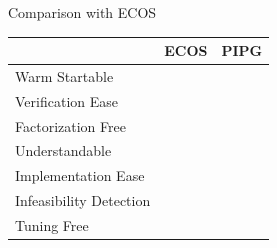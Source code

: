 \documentclass[aspectratio=169]{beamer}
\newcommand{\cmark}{\textcolor{green}{\text{\ding{51}}}}
\newcommand{\xmark}{\textcolor{red}{\text{\ding{55}}}}
\begin{document}
\begin{frame}{Comparison with ECOS}
    \begin{center}
        \begin{tabular}{ |p{4cm}||p{1cm}|p{1cm}|}
            \hline
              & ECOS & PIPG \\
            \hline
            Warm Startable   & \xmark    &\cmark\\
            Verification Ease   & \xmark    &\cmark\\
            Factorization Free&   \xmark  & \cmark\\
            Understandable &   \xmark  & \cmark\\
            Implementation Ease&   \xmark  & \cmark\\
            Infeasibility Detection&   \cmark  & \cmark\\
            Tuning Free&   \cmark  & \xmark\\
            \hline
        \end{tabular}       
    \end{center}
\end{frame}
\end{document}

